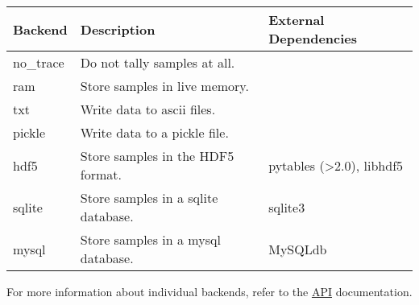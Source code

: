 \leavevmode
\begin{longtable}[c]{|p{0.133\locallinewidth}|p{0.447\locallinewidth}|p{0.307\locallinewidth}|}
\hline
\textbf{
Backend
} & \textbf{
Description
} & \textbf{
External Dependencies
} \\
\hline
\endhead

no{\_}trace
 & 
Do not tally samples at all.
 &  \\
\hline

ram
 & 
Store samples in live memory.
 &  \\
\hline

txt
 & 
Write data to ascii files.
 &  \\
\hline

pickle
 & 
Write data to a pickle file.
 &  \\
\hline

hdf5
 & 
Store samples in the HDF5 format.
 & 
pytables ({\textgreater}2.0), libhdf5
 \\
\hline

sqlite
 & 
Store samples in a sqlite database.
 & 
sqlite3
 \\
\hline

mysql
 & 
Store samples in a mysql database.
 & 
MySQLdb
 \\
\hline
\end{longtable}

For more information about individual backends, refer to the \href{docs/API.pdf}{API} documentation.

\